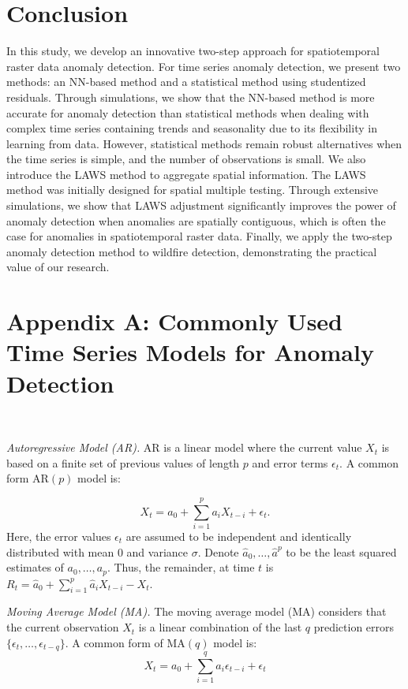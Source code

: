 \documentclass[11pt]{article}
\begin{document}
\section{Conclusion}
In this study, we develop an innovative two-step approach for spatiotemporal raster data anomaly detection. For time series anomaly detection, we present two methods: an NN-based method and a statistical method using studentized residuals. Through simulations, we show that the NN-based method is more accurate for anomaly detection than statistical methods when dealing with complex time series containing trends and seasonality due to its flexibility in learning from data. However, statistical methods remain robust alternatives when the time series is simple, and the number of observations is small. We also introduce the LAWS method to aggregate spatial information. The LAWS method was initially designed for spatial multiple testing. Through extensive simulations, we show that LAWS adjustment significantly improves the power of anomaly detection when anomalies are spatially contiguous, which is often the case for anomalies in spatiotemporal raster data. Finally, we apply the two-step anomaly detection method to wildfire detection, demonstrating the practical value of our research.






\clearpage

\appendix
\section*{Appendix A: Commonly Used Time Series Models for Anomaly Detection}\

\textit{Autoregressive Model (AR).} AR is a linear model where the current value $X_t$ is based on a finite set of previous values of length $p$ and error terms $\epsilon_t$. A common form AR$(p)$ model is:

\begin{equation}\label{eq:ar}
	X_t = a_0 + \sum_{i=1}^{p}a_iX_{t-i} + \epsilon_t.
\end{equation}
Here, the error values $\epsilon_t$ are assumed to be independent and identically distributed with mean 0 and variance $\sigma$. Denote $\hat{a}_0,\ldots, \hat{a}^p$ to be the least squared estimates of $a_0,\ldots, a_p$. Thus, the remainder,  at time $t$ is $R_t=\hat{a}_0 + \sum_{i=1}^{p}\hat{a}_iX_{t-i} - X_t$.

\textit{Moving Average Model (MA).} The moving average model (MA) considers that the current observation $X_t$ is a linear combination of the last $q$ prediction errors $\{\epsilon_t,\ldots,\epsilon_{t-q}\}$. A common form of MA$(q)$ model is:
\begin{equation}
	X_t = a_0+\sum_{i=1}^q a_i\epsilon_{t-i}+\epsilon_t
\end{equation}
\end{document}
